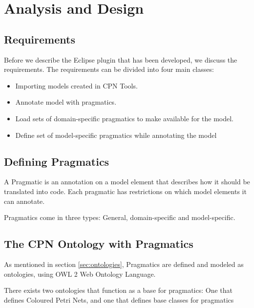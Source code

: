 \chapter{Analysis and Design}
\label{chap:analysis}

\section{Requirements} 
Before we describe the Eclipse plugin that has been developed, we discuss the
requirements.
The requirements can be divided into four main classes:

\begin{itemize} 
	\item Importing models created in CPN Tools. 

	\item Annotate model with pragmatics. 
		
	\item Load sets of domain-specific pragmatics to make available for the model.
	
	\item Define set of model-specific pragmatics while annotating the model

\end{itemize}

\section{Defining Pragmatics}

A Pragmatic is an annotation on a model element that describes how it should be
translated into code. Each pragmatic has restrictions on which model elements it
can annotate.

Pragmatics come in three types: General, domain-specific and model-specific.



\section{The CPN Ontology with Pragmatics}
As mentioned in section \ref{sec:ontologies}, Pragmatics are defined and modeled
as ontologies, using OWL 2 Web Ontology Language.  

There exists two ontologies that function as a base for pragmatics: One that
defines Coloured Petri Nets, and one that defines base classes for pragmatics

